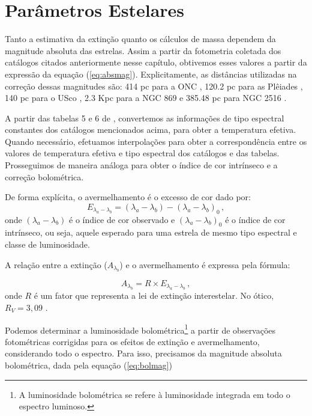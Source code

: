     \section{Parâmetros Estelares}\label{sec:parametros}
        Tanto a estimativa da extinção quanto os cálculos de massa dependem da magnitude absoluta das estrelas. Assim a partir da fotometria coletada dos catálogos citados anteriormente nesse capítulo, obtivemos esses valores a partir da expressão da equação (\ref{eq:absmag}).
        Explicitamente, as distâncias utilizadas na correção dessas magnitudes são: 414 pc para a ONC \cite{davies2014accretion}, 120.2 pc para as Plêiades \cite{lodieu2019fiveD}, 140 pc para o USco \cite{rebull2018rotation}, 2.3 Kpc para a NGC 869 \cite{moraux2013monitor} e 385.48 pc para NGC 2516 \cite{jackson2012why}.
         
        A partir das tabelas 5 e 6 de , convertemos as informações de tipo espectral constantes dos catálogos mencionados acima, para obter a temperatura efetiva. Quando necessário, efetuamos interpolações para obter a correspondência entre os valores de temperatura efetiva e tipo espectral dos catálogos e das tabelas. Prosseguimos de maneira análoga para obter o índice de cor intrínseco e a correção bolométrica.
        
        De forma explícita, o avermelhamento é o excesso de cor dado por:
        \begin{equation}
            \label{eq:avermelhamento}
            E_{\lambda_a-\lambda_b} = (\lambda_a - \lambda_b) - (\lambda_a - \lambda_b)_0\, ,
        \end{equation} 
        \noindent onde \((\lambda_a - \lambda_b)\) é o índice de cor observado e \((\lambda_a - \lambda_b)_0\) é o índice de cor intrínseco, ou seja, aquele esperado para uma estrela de mesmo tipo espectral e classe de luminosidade.
        
        A relação entre a extinção (\(A_{\lambda_b}\)) e o avermelhamento é expressa pela fórmula:
        
        \begin{equation}
            \label{eq:extincao}
            A_{\lambda_b} = R \times E_{\lambda_a - \lambda_b}\, ,
        \end{equation}
        \noindent onde \(R\) é um fator que representa a lei de extinção interestelar. No ótico, \(R_V = 3,09\) \cite{rieke1985interstellar}.
    
         Podemos determinar a luminosidade bolométrica\footnote{ A luminosidade bolométrica se refere à luminosidade integrada em todo o espectro luminoso.} a partir de observações fotométricas corrigidas para os efeitos de extinção e avermelhamento, considerando todo o espectro. Para isso, precisamos da magnitude absoluta bolométrica, dada pela equação (\ref{eq:bolmag})

